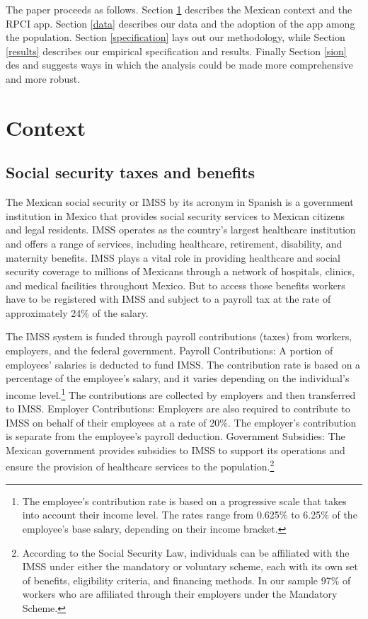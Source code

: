 \documentclass[oneside,11pt]{article}
\begin{document}
The paper proceeds as follows. Section \ref{context} describes the Mexican context and the RPCI app. Section \ref{data} describes our data and the adoption of the app among the population. Section \ref{specification} lays out our methodology, while Section \ref{results} describes our empirical specification and results. Finally Section \ref{sion} des and suggests ways in which the analysis could be made more comprehensive and more robust.


\section{Context} \label{context}

\vspace{.2in}

\subsection{Social security taxes and benefits}

The Mexican social security  or IMSS by its acronym in Spanish is a government institution in Mexico that provides social security services to Mexican citizens and legal residents. IMSS operates as the country's largest healthcare institution and offers a range of services, including healthcare, retirement, disability, and maternity benefits. IMSS plays a vital role in providing healthcare and social security coverage to millions of Mexicans through a network of hospitals, clinics, and medical facilities throughout Mexico. But to access those benefits workers have to be registered with IMSS and subject to a payroll tax at the rate of approximately 24\% of the salary. 

The IMSS system is funded through payroll contributions (taxes) from workers, employers, and the federal government. Payroll Contributions: A portion of employees' salaries is deducted to fund IMSS. The contribution rate is based on a percentage of the employee's salary, and it varies depending on the individual's income level.\footnote{The employee's contribution rate is based on a progressive scale that takes into account their income level. The rates range from 0.625\% to 6.25\% of the employee's base salary, depending on their income bracket.} The contributions are collected by employers and then transferred to IMSS. Employer Contributions: Employers are also required to contribute to IMSS on behalf of their employees at a rate of 20\%. The employer's contribution is separate from the employee's payroll deduction. Government Subsidies: The Mexican government provides subsidies to IMSS to support its operations and ensure the provision of healthcare services to the population.\footnote{According to the Social Security Law, individuals can be affiliated with the IMSS under either the mandatory or voluntary scheme, each with its own set of benefits, eligibility criteria, and financing methods. In our sample 97\% of workers who are affiliated through their employers under the Mandatory Scheme.}
\end{document}

